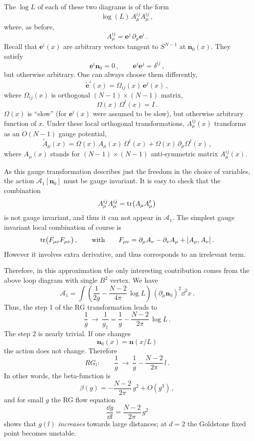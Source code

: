 The $\log L$ of each of these two diagrams is of the form
\[
\log(L)\,A_\mu^{ij}A_\mu^{ij}\,,
\]
where, as before,
\[
A_\mu^{ij}=\mathbf e^j\,\partial_\mu\mathbf e^i\,.
\]
Recall that $\mathbf e^i(x)$ are arbitrary vectors tangent to $S^{N-1}$ at
$\mathbf n_0(x)$. They satisfy
\[
\mathbf e^i\mathbf n_0=0\,,\qquad\mathbf e^i\mathbf e^j=\delta^{ij}\,,
\]
but otherwise arbitrary. One can always choose them differently,
\[
\tilde{\mathbf e}^i(x)=\Omega_{ij}(x)\,\mathbf e^j(x)\,,
\]
where $\Omega_{ij}(x)$ is orthogonal $(N-1)\times(N-1)$ matrix,
\[
\Omega(x)\,\Omega^t(x)=I\,.
\]
$\Omega(x)$ is ``slow'' (for $\mathbf e^i(x)$ were assumed to be slow), but
otherwise arbitrary function of $x$. Under these local orthogonal transformations,
$A_\mu^{ij}(x)$ transforms as an $O(N-1)$ gauge potential,
\[
\tilde A_\mu(x)=\Omega(x)\,A_\mu(x)\,\Omega^t(x)+\Omega(x)\,\partial_\mu\Omega^t(x)\,,
\]
where $A_\mu(x)$ stands for $(N-1)\times(N-1)$ anti-symmetric matrix
$A_\mu^{ij}(x)$.

As this gauge transformation describes just the freedom in the choice of
variables, the action $\mathcal A_1[\mathbf n_0]$ must be gauge invariant. It is
easy to check that the combination
\[
A_\mu^{ij}A_\mu^{ij}=\operatorname{tr}\bigl(A_\mu A_\mu^t\bigr)
\]
is not gauge invariant, and thus it can not appear in $\mathcal A_1$. The simplest
gauge invariant local combination of course is
\[
\operatorname{tr}\bigl(F_{\mu\nu}F_{\mu\nu}\bigr)\,,\qquad\text{with}\qquad
F_{\mu\nu}=\partial_\mu A_\nu-\partial_\nu A_\mu+[A_\mu,A_\nu]\,.
\]
However it involves extra derivative, and thus corresponds to an irrelevant term.

Therefore, in this approximation the only interesting contribution comes from the
above loop diagram with single $B^2$ vertex. We have
\begin{equation}\label{eq:A1sigma}
\mathcal A_1=\int\left(\frac1{2g}-\frac{N-2}{4\pi}\,\log L\right)\,(\partial_\mu\mathbf n_0)^2\dd^2x\,.
\end{equation}
Thus, the step 1 of the RG transformation leads to
\[
\frac1g\ \to\ \frac1{g_1}=\frac1g-\frac{N-2}{2\pi}\,\log L\,.
\]
The step 2 is nearly trivial. If one changes
\[
\mathbf n_0(x)=\mathbf n(x/L)
\]
the action does not change. Therefore
\[
RG_l:\qquad\frac1g\ \to\ \frac1g-\frac{N-2}{2\pi}\,l\,.
\]
In other words, the beta-function is
\[
\beta(g)=-\frac{N-2}{2\pi}\,g^2+O(g^3)\,,
\]
and for small $g$ the RG flow equation
\[
\frac{\dd g}{\dd l}=\frac{N-2}{2\pi}\,g^2
\]
shows that $g(l)$ \emph{increases} towards large distances; at $d=2$ the Goldstone
fixed point becomes unstable.

